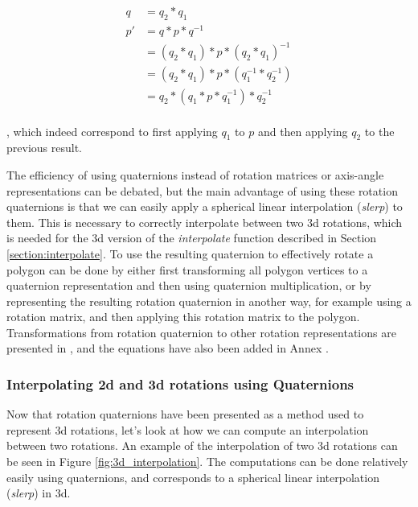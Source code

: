 \begin{equation}
\begin{split}
    q   & = q_2*q_1 \\
    p'  & = q*p*q^{-1} \\
        & = (q_2*q_1)*p*(q_2*q_1)^{-1} \\
        & =  (q_2*q_1)*p*(q_1^{-1}*q_2^{-1}) \\
        & = q_2*(q_1*p*q_1^{-1})*q_2^{-1} \\
\end{split}
\end{equation}

, which indeed correspond to first applying \( q_1 \) to \( p \) and then applying \( q_2 \) to the previous result.

The efficiency of using quaternions instead of rotation matrices or axis-angle representations can be debated, but the main advantage of using these rotation quaternions is that we can easily apply a spherical linear interpolation (\textit{slerp}) to them. This is necessary to correctly interpolate between two 3d rotations, which is needed for the 3d version of the \textit{interpolate} function described in Section \ref{section:interpolate}. To use the resulting quaternion to effectively rotate a polygon can be done by either first transforming all polygon vertices to a quaternion representation and then using quaternion multiplication, or by representing the resulting rotation quaternion in another way, for example using a rotation matrix, and then applying this rotation matrix to the polygon. Transformations from rotation quaternion to other rotation representations are presented in \cite{ISO19141_moving_features}, and the equations have also been added in Annex .
    
\subsubsection{Interpolating 2d and 3d rotations using Quaternions}

Now that rotation quaternions have been presented as a method used to represent 3d rotations, let's look at how we can compute an interpolation between two rotations. An example of the interpolation of two 3d rotations can be seen in Figure \ref{fig:3d_interpolation}. The computations can be done relatively easily using quaternions, and corresponds to a spherical linear interpolation (\textit{slerp}) in 3d.

